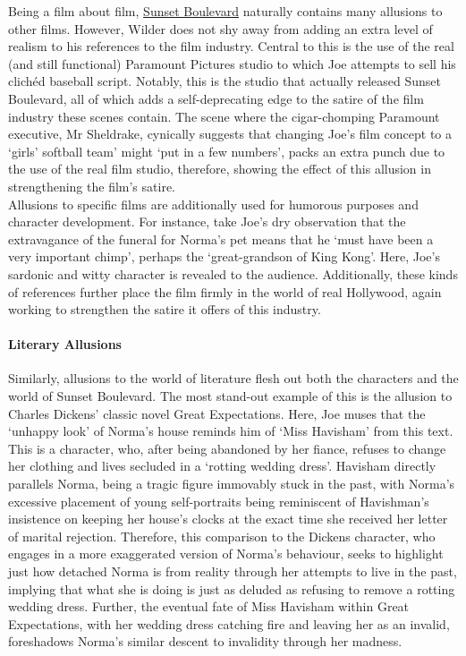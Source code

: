 \documentclass[a4paper]{article}
\begin{document}
Being a film about film, \underline{Sunset Boulevard} naturally contains many allusions to other films. However, Wilder does not shy away from adding an extra level of realism to his references to the film industry. Central to this is the use of the real (and still functional) Paramount Pictures studio to which Joe attempts to sell his clichéd baseball script. Notably, this is the studio that actually released Sunset Boulevard, all of which adds a self-deprecating edge to the satire of the film industry these scenes contain. The scene where the cigar-chomping Paramount executive, Mr Sheldrake, cynically suggests that changing Joe’s film concept to a ‘girls' softball team’ might ‘put in a few numbers’, packs an extra punch due to the use of the real film studio, therefore, showing the effect of this allusion in strengthening the film’s satire.\\

Allusions to specific films are additionally used for humorous purposes and character development. For instance, take Joe’s dry observation that the extravagance of the funeral for Norma’s pet means that he ‘must have been a very important chimp’, perhaps the ‘great-grandson of King Kong’. Here, Joe’s sardonic and witty character is revealed to the audience. Additionally, these kinds of references further place the film firmly in the world of real Hollywood, again working to strengthen the satire it offers of this industry. \\


\paragraph{Literary Allusions}
Similarly, allusions to the world of literature flesh out both the characters and the world of Sunset Boulevard. The most stand-out example of this is the allusion to Charles Dickens’ classic novel Great Expectations. Here, Joe muses that the ‘unhappy look’ of Norma’s house reminds him of ‘Miss Havisham’ from this text. This is a character, who, after being abandoned by her fiance, refuses to change her clothing and lives secluded in a ‘rotting wedding dress’. Havisham directly parallels Norma, being a tragic figure immovably stuck in the past, with Norma's excessive placement of young self-portraits being reminiscent of Havishman’s insistence on keeping her house’s clocks at the exact time she received her letter of marital rejection. Therefore, this comparison to the Dickens character, who engages in a more exaggerated version of Norma’s behaviour, seeks to highlight just how detached Norma is from reality through her attempts to live in the past, implying that what she is doing is just as deluded as refusing to remove a rotting wedding dress. Further, the eventual fate of Miss Havisham within Great Expectations, with her wedding dress catching fire and leaving her as an invalid, foreshadows Norma’s similar descent to invalidity through her madness.
\end{document}
